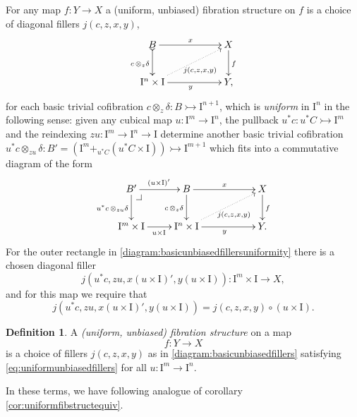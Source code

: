 \documentclass[12pt]{article}
\makeatletter
\newcommand{\pbcorner}[1][dr]{\save*!/#1-1.2pc/#1:(-1,1)@^{|-}\restore}
\newcommand{\mono}{\ensuremath{\rightarrowtail}}
\newcommand{\ra}{\ensuremath{\rightarrow}}
\newcommand{\I}{\ensuremath{\mathrm{I}}}
\theoremstyle{remark}
\theoremstyle{definition}
\newtheorem{definition}[theorem]{Definition}
\makeatother
\begin{document}
For any map $f:Y\ra X$  a  (uniform, unbiased) fibration structure on $f$ is a choice of diagonal fillers $j(c,z,x,y)$,
\begin{equation}\label{diagram:basicunbiasedfillers}
\xymatrix{
B \ar@{>->}[d]_{c\,\otimes_z\delta} \ar[rr]^x && X \ar[d]^f \\
\I^{n}\times \I \ar@{.>}[rru]_{j(c,z,x,y)} \ar[rr]_y && Y,
}
\end{equation}
for each basic trivial cofibration $c \otimes_z \delta : B \mono \I^{n+1}$, which is \emph{uniform} in $\I^n$ in the following sense: given any cubical map $u : \I^m \ra \I^n$, the pullback $u^*c : u^*C\mono \I^m$ and the reindexing $zu : \I^m \ra \I^n\ra\I$ determine another basic trivial cofibration $u^*c \otimes_{zu} \delta : B' = (\I^m +_{u^*C} (u^*C\times\I)) \mono \I^{m+1}$ which fits into a commutative diagram of the form
\begin{equation}\label{diagram:basicunbiasedfillersuniformity}
\xymatrix{
B' \ar[d]_{u^*c\,\otimes_{zu}\delta} \ar[r]^{(u\times \I)'} \pbcorner  & B \ar[d]_{c\,\otimes_z\delta} \ar[rr]^x && X \ar[d]^f \\
\I^{m}\times \I  \ar[r]_{u\times \I} & \I^{n}\times \I \ar@{.>}[rru]_{j(c,z,x,y)} \ar[rr]_y && Y.
}
\end{equation}
For the outer rectangle in \eqref{diagram:basicunbiasedfillersuniformity} there is a chosen diagonal filler 
$$j(u^*c,zu,x(u\times \I)', y(u\times \I)): \I^m\times\I\ra X,$$ and for this map we require that
\begin{equation}\label{eq:uniformunbiasedfillers}
j(u^*c,zu,x(u\times \I)', y(u\times \I)) = j(c,z,x,y)\circ (u\times \I).
\end{equation}

\begin{definition}\label{def:unbiasedfibstructure} A \emph{(uniform, unbiased) fibration structure} on a map $$f: Y\ra X$$ is a choice of fillers $j(c,z,x,y)$ as in \eqref{diagram:basicunbiasedfillers} satisfying \eqref{eq:uniformunbiasedfillers} for all $u : \I^m\ra\I^n$.
\end{definition}

In these terms, we have following analogue of corollary \ref{cor:uniformfibstructequiv}.
\end{document}
